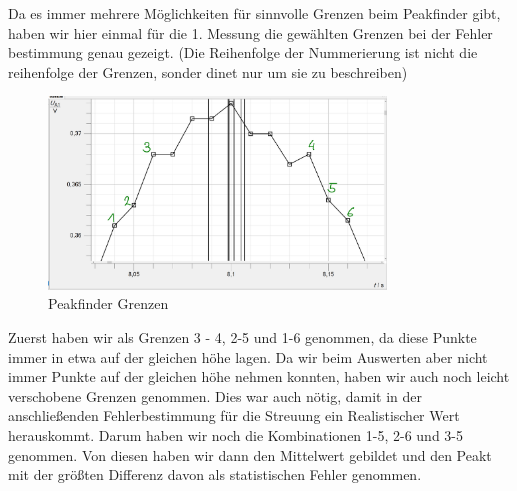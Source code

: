 \documentclass[twoside]{protokoll}
\begin{document}
Da es immer mehrere Möglichkeiten für sinnvolle Grenzen beim Peakfinder gibt, haben wir hier einmal für die 1. Messung die gewählten Grenzen bei der Fehler bestimmung genau gezeigt.
(Die Reihenfolge der Nummerierung ist nicht die reihenfolge der Grenzen, sonder dinet nur um sie zu beschreiben)
\begin{figure}[H]
    \centering
    \includegraphics[width=0.8\textwidth]{plots/unsicherheit-bestimmen-stange1-punkte.pdf}
    \caption{Peakfinder Grenzen}
     
\end{figure}
Zuerst haben wir als Grenzen 3 - 4, 2-5 und 1-6 genommen, da diese Punkte immer in etwa auf der gleichen höhe lagen.
Da wir beim Auswerten aber nicht immer Punkte auf der gleichen höhe nehmen konnten, haben wir auch noch leicht verschobene Grenzen genommen.
Dies war auch nötig, damit in der anschließenden Fehlerbestimmung für die Streuung ein Realistischer Wert herauskommt.
Darum haben wir noch die Kombinationen 1-5, 2-6 und 3-5 genommen.
Von diesen haben wir dann den Mittelwert gebildet und den Peakt mit der größten Differenz davon als statistischen Fehler genommen.
\end{document}
